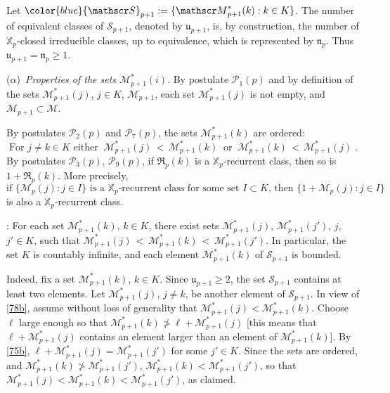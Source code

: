 \documentclass[reqno]{amsart}
\theoremstyle{plain}
\theoremstyle{definition}
\newcommand{\mc}[1]{{\mathcal #1}}
\newcommand{\mf}[1]{{\mathfrak #1}}
\newcommand{\bb}[1]{{\mathbb #1}}
\newcommand{\ms}[1]{{\mathscr #1}}
\newcounter{as}[section]
\newcommand{\<}{\langle}
\renewcommand{\>}{\rangle}
\begin{document}
Let ${\color{blue}\ms S_{p+1}} := \{ \ms M^*_{p+1}(k) : k\in K\}$.
The number of equivalent classes of $\ms S_{p+1}$, denoted by
$\mf u_{p+1}$, is, by construction, the number of $\bb X_p$-closed
irreducible classes, up to equivalence, which is represented by
$\mf n_p$. Thus $\mf u_{p+1} = \mf n_p\ge 1$.

\medskip\noindent ($\alpha$){\it \ Properties of the sets
$\ms M^*_{p+1}(i)$}.  By postulate $\mc P_1(p)$ and by definition of
the sets $\ms M^*_{p+1}(j)$, $j\in K$, $\ms M_{p+1}$, each set
$\ms M^*_{p+1}(j)$ is not empty, and $\ms M_{p+1} \subset \mc M$. 

By postulates $\mc P_2(p)$ and $\mc P_7(p)$, the sets
$\ms M^*_{p+1}(k)$ are ordered:
\begin{equation}
\label{78b}
\text{For $j\neq k \in K$ either}\;\;
\ms M^*_{p+1}(j) \,<\, \ms M^*_{p+1}(k) \;\;\text{or}\;\;
\ms M^*_{p+1}(k) \,<\, \ms M^*_{p+1}(j)\;.
\end{equation}
By postulates $\mc P_3(p)$, $\mc P_9(p)$, if $\mf R_p(k)$ is a
$\bb X_p$-recurrent class, then so is $1+\mf R_p(k)$. More precisely,
\begin{equation}
\label{75b}
\text{if $\{\ms M_p(j) : j\in I\}$ is a $\bb X_p$-recurrent
class for some set $I\subset K$, then $\{1+\ms M_p(j) : j\in I\}$}
\end{equation}
is also a $\bb X_p$-recurrent class.

\smallskip{}: For each set
$\ms M^*_{p+1}(k)$, $k\in K$, there exist sets $\ms M^*_{p+1}(j)$,
$\ms M^*_{p+1}(j')$, $j$, $j'\in K$, such that
$\ms M^*_{p+1}(j) \,<\, \ms M^*_{p+1}(k) \,<\, \ms M^*_{p+1}(j')$.  In
particular, the set $K$ is countably infinite, and each element
$\ms M^*_{p+1}(k)$ of $\ms S_{p+1}$ is bounded.  \smallskip

Indeed, fix a set $\ms M^*_{p+1}(k)$, $k\in K$.  Since
$\mf u_{p+1}\ge 2$, the set $\ms S_{p+1}$ contains at least two
elements. Let $\ms M^*_{p+1}(j)$, $j\neq k$, be another element of
$\ms S_{p+1}$. In view of \eqref{78b}, assume without loss of
generality that $\ms M^*_{p+1}(j) < \ms M^*_{p+1}(k)$. Choose $\ell$
large enough so that $\ms M^*_{p+1}(k) \not> \ell + \ms M^*_{p+1}(j)$
[this means that $\ell + \ms M^*_{p+1}(j)$ contains an element larger
than an element of $\ms M^*_{p+1}(k)$]. By \eqref{75b},
$\ell + \ms M^*_{p+1}(j) = \ms M^*_{p+1}(j')$ for some $j'\in K$.
Since the sets are ordered, and
$\ms M^*_{p+1}(k) \not> \ms M^*_{p+1}(j')$,
$\ms M^*_{p+1}(k) < \ms M^*_{p+1}(j')$, so that
$\ms M^*_{p+1}(j) < \ms M^*_{p+1}(k) < \ms M^*_{p+1}(j')$, as claimed.
\end{document}
